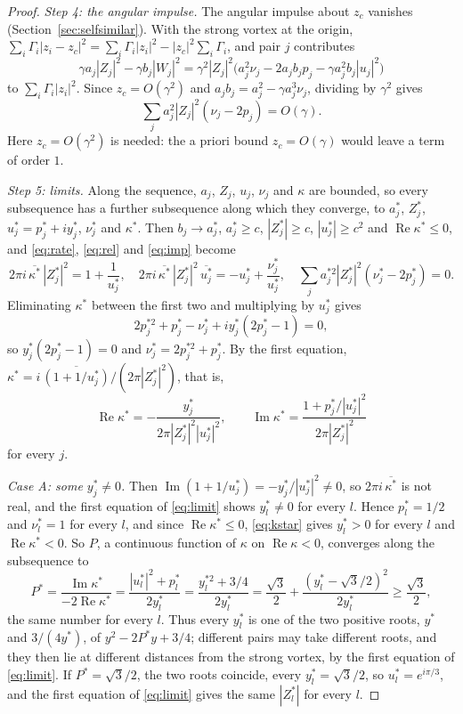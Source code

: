\documentclass[11pt]{article}
\theoremstyle{definition}
\newcommand{\re}{\operatorname{Re}}
\newcommand{\im}{\operatorname{Im}}
\begin{document}
\begin{proof}
\emph{Step 4: the angular impulse.} The angular impulse about $z_c$ vanishes (Section~\ref{sec:selfsimilar}). With the strong vortex at the origin, $\sum_i \Gamma_i |z_i - z_c|^2 = \sum_i \Gamma_i |z_i|^2 - |z_c|^2 \sum_i \Gamma_i$, and pair $j$ contributes
\[
  \gamma a_j|Z_j|^2 - \gamma b_j|W_j|^2 = \gamma^2|Z_j|^2\bigl(a_j^2\nu_j - 2a_jb_jp_j - \gamma a_j^2 b_j|u_j|^2\bigr)
\]
to $\sum_i \Gamma_i|z_i|^2$. Since $z_c = O(\gamma^2)$ and $a_jb_j = a_j^2 - \gamma a_j^3\nu_j$, dividing by $\gamma^2$ gives
\begin{equation}\label{eq:imp}
  \sum_j a_j^2|Z_j|^2(\nu_j - 2p_j) = O(\gamma).
\end{equation}
Here $z_c = O(\gamma^2)$ is needed: the a priori bound $z_c = O(\gamma)$ would leave a term of order $1$.

\emph{Step 5: limits.} Along the sequence, $a_j$, $Z_j$, $u_j$, $\nu_j$ and $\kappa$ are bounded, so every subsequence has a further subsequence along which they converge, to $a_j^*$, $Z_j^*$, $u_j^* = p_j^* + iy_j^*$, $\nu_j^*$ and $\kappa^*$. Then $b_j \to a_j^*$, $a_j^* \ge c$, $|Z_j^*| \ge c$, $|u_j^*| \ge c^2$ and $\re\kappa^* \le 0$, and \eqref{eq:rate}, \eqref{eq:rel} and \eqref{eq:imp} become
\begin{equation}\label{eq:limit}
  2\pi i\,\overline{\kappa^*}\,|Z_j^*|^2 = 1 + \frac{1}{u_j^*}, \quad
  2\pi i\,\overline{\kappa^*}\,|Z_j^*|^2\,\overline{u_j^*} = -u_j^* + \frac{\nu_j^*}{u_j^*}, \quad
  \sum_j a_j^{*2}|Z_j^*|^2(\nu_j^* - 2p_j^*) = 0.
\end{equation}
Eliminating $\kappa^*$ between the first two and multiplying by $u_j^*$ gives
\[
  2p_j^{*2} + p_j^* - \nu_j^* + iy_j^*(2p_j^* - 1) = 0,
\]
so $y_j^*(2p_j^* - 1) = 0$ and $\nu_j^* = 2p_j^{*2} + p_j^*$. By the first equation, $\kappa^* = i\,\overline{(1 + 1/u_j^*)}/(2\pi|Z_j^*|^2)$, that is,
\begin{equation}\label{eq:kstar}
  \re\kappa^* = -\frac{y_j^*}{2\pi|Z_j^*|^2|u_j^*|^2}, \qquad \im\kappa^* = \frac{1 + p_j^*/|u_j^*|^2}{2\pi|Z_j^*|^2}
\end{equation}
for every $j$.

\emph{Case A: some $y_j^* \ne 0$.} Then $\im(1 + 1/u_j^*) = -y_j^*/|u_j^*|^2 \ne 0$, so $2\pi i\,\overline{\kappa^*}$ is not real, and the first equation of \eqref{eq:limit} shows $y_l^* \ne 0$ for every $l$. Hence $p_l^* = 1/2$ and $\nu_l^* = 1$ for every $l$, and since $\re\kappa^* \le 0$, \eqref{eq:kstar} gives $y_l^* > 0$ for every $l$ and $\re\kappa^* < 0$. So $P$, a continuous function of $\kappa$ on $\re\kappa < 0$, converges along the subsequence to
\[
  P^* = \frac{\im\kappa^*}{-2\re\kappa^*} = \frac{|u_l^*|^2 + p_l^*}{2y_l^*} = \frac{y_l^{*2} + 3/4}{2y_l^*} = \frac{\sqrt{3}}{2} + \frac{(y_l^* - \sqrt{3}/2)^2}{2y_l^*} \ge \frac{\sqrt{3}}{2},
\]
the same number for every $l$. Thus every $y_l^*$ is one of the two positive roots, $y^*$ and $3/(4y^*)$, of $y^2 - 2P^*y + 3/4$; different pairs may take different roots, and they then lie at different distances from the strong vortex, by the first equation of \eqref{eq:limit}. If $P^* = \sqrt{3}/2$, the two roots coincide, every $y_l^* = \sqrt{3}/2$, so $u_l^* = e^{i\pi/3}$, and the first equation of \eqref{eq:limit} gives the same $|Z_l^*|$ for every $l$.


\end{proof}
\end{document}
